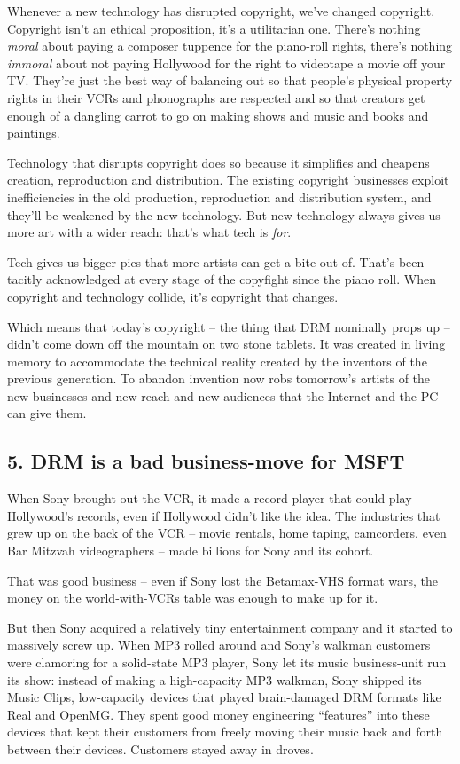 Whenever a new technology has disrupted copyright, we've changed
copyright. Copyright isn't an ethical proposition, it's a
utilitarian one. There's nothing \emph{moral} about paying a
composer tuppence for the piano-roll rights, there's nothing
\emph{immoral} about not paying Hollywood for the right to
videotape a movie off your TV. They're just the best way of
balancing out so that people's physical property rights in their
VCRs and phonographs are respected and so that creators get enough
of a dangling carrot to go on making shows and music and books and
paintings.

Technology that disrupts copyright does so because it simplifies
and cheapens creation, reproduction and distribution. The existing
copyright businesses exploit inefficiencies in the old production,
reproduction and distribution system, and they'll be weakened by
the new technology. But new technology always gives us more art
with a wider reach: that's what tech is \emph{for}.

Tech gives us bigger pies that more artists can get a bite out of.
That's been tacitly acknowledged at every stage of the copyfight
since the piano roll. When copyright and technology collide, it's
copyright that changes.

Which means that today's copyright -- the thing that DRM nominally
props up -- didn't come down off the mountain on two stone tablets.
It was created in living memory to accommodate the technical
reality created by the inventors of the previous generation. To
abandon invention now robs tomorrow's artists of the new businesses
and new reach and new audiences that the Internet and the PC can
give them.

\subsection{5. DRM is a bad business-move for MSFT}

When Sony brought out the VCR, it made a record player that could
play Hollywood's records, even if Hollywood didn't like the idea.
The industries that grew up on the back of the VCR -- movie
rentals, home taping, camcorders, even Bar Mitzvah videographers --
made billions for Sony and its cohort.

That was good business -- even if Sony lost the Betamax-VHS format
wars, the money on the world-with-VCRs table was enough to make up
for it.

But then Sony acquired a relatively tiny entertainment company and
it started to massively screw up. When MP3 rolled around and Sony's
walkman customers were clamoring for a solid-state MP3 player, Sony
let its music business-unit run its show: instead of making a
high-capacity MP3 walkman, Sony shipped its Music Clips,
low-capacity devices that played brain-damaged DRM formats like
Real and OpenMG. They spent good money engineering ``features'' into
these devices that kept their customers from freely moving their
music back and forth between their devices. Customers stayed away
in droves.

